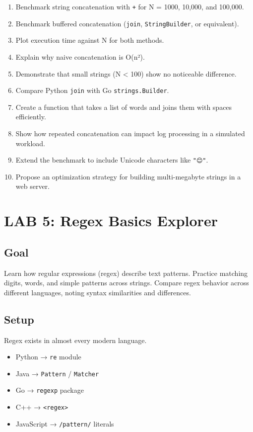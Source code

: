 \documentclass[
  letterpaper,
  DIV=11,
  numbers=noendperiod]{scrreprt}
\providecommand{\tightlist}{%
  \setlength{\itemsep}{0pt}\setlength{\parskip}{0pt}}
\begin{document}
\begin{enumerate}
\def\labelenumi{\arabic{enumi}.}
\tightlist
\item
  Benchmark string concatenation with \texttt{+} for N = 1000, 10,000,
  and 100,000.
\item
  Benchmark buffered concatenation (\texttt{join},
  \texttt{StringBuilder}, or equivalent).
\item
  Plot execution time against N for both methods.
\item
  Explain why naive concatenation is O(n²).
\item
  Demonstrate that small strings (N \textless{} 100) show no noticeable
  difference.
\item
  Compare Python \texttt{join} with Go \texttt{strings.Builder}.
\item
  Create a function that takes a list of words and joins them with
  spaces efficiently.
\item
  Show how repeated concatenation can impact log processing in a
  simulated workload.
\item
  Extend the benchmark to include Unicode characters like \texttt{"😊"}.
\item
  Propose an optimization strategy for building multi-megabyte strings
  in a web server.
\end{enumerate}

\section{LAB 5: Regex Basics
Explorer}\label{lab-5-regex-basics-explorer}

\subsection{Goal}\label{goal-4}

Learn how regular expressions (regex) describe text patterns. Practice
matching digits, words, and simple patterns across strings. Compare
regex behavior across different languages, noting syntax similarities
and differences.

\subsection{Setup}\label{setup-4}

Regex exists in almost every modern language.

\begin{itemize}
\tightlist
\item
  Python → \texttt{re} module
\item
  Java → \texttt{Pattern} / \texttt{Matcher}
\item
  Go → \texttt{regexp} package
\item
  C++ → \texttt{\textless{}regex\textgreater{}}
\item
  JavaScript → \texttt{/pattern/} literals
\end{itemize}
\end{document}
